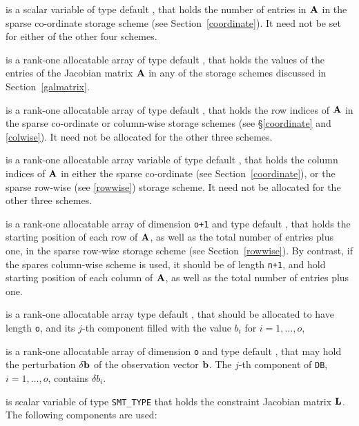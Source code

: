 \documentclass{galahad}
\begin{document}
\begin{description}
\begin{description}
 is a scalar variable of type default \integer, that 
holds the number of entries in ${\mathbf{A}}$
in the sparse co-ordinate storage scheme (see Section~\ref{coordinate}). 
It need not be set for either of the other four schemes.

 is a rank-one allocatable array of type default \realdp, that holds
the values of the entries of the Jacobian matrix ${\mathbf{A}}$ in any of the 
storage schemes discussed in Section~\ref{galmatrix}.

 is a rank-one allocatable array of type default \integer,
that holds the row indices of ${\mathbf{A}}$ in the sparse co-ordinate 
or column-wise storage schemes (see \S\ref{coordinate} and \ref{colwise}).
It need not be allocated for the other three schemes.

 is a rank-one allocatable array variable of type default \integer,
that holds the column indices of ${\mathbf{A}}$ in either the sparse co-ordinate 
(see Section~\ref{coordinate}), or the sparse row-wise 
(see \ref{rowwise}) storage scheme.
It need not be allocated for the other three schemes.

 is a rank-one allocatable array of dimension {\tt o+1} and type 
default \integer, that holds the 
starting position of each row of ${\mathbf{A}}$, as well
as the total number of entries plus one, in the sparse row-wise storage
scheme (see Section~\ref{rowwise}). By contrast, if the spares column-wise 
scheme is used, it should be of length {\tt n+1}, and hold
starting position of each column of ${\mathbf{A}}$, as well
as the total number of entries plus one.
\end{description}

 is a rank-one allocatable array type default \realdp, that 
should be allocated to have length {\tt o}, and its $j$-th component 
filled with the value $b_{i}$ for $i = 1, \ldots , o$, 

 is a rank-one allocatable array of dimension {\tt o} and type 
default \realdp, that may hold the perturbation $\delta {\mathbf{b}}$ 
of the observation vector ${\mathbf{b}}$.
The $j$-th component of 
{\tt DB}, $i = 1,  \ldots ,  o$, contains $\delta b_{i}$.

 is scalar variable of type {\tt SMT\_TYPE} that holds the constraint 
Jacobian matrix ${\mathbf{L}}$. The following components are used:

\begin{description}


\end{description}
\end{description}
\end{document}
